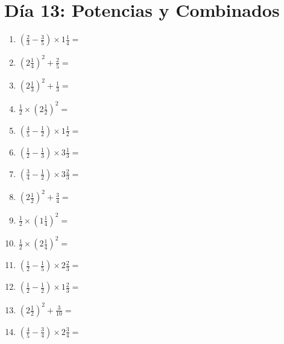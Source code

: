 \documentclass[12pt]{article}
\begin{document}
\section*{Día 13: Potencias y Combinados}
\begin{enumerate}
\item \large $ \left( \frac{2}{3} - \frac{3}{5} \right) \times 1 \frac{1}{4} = $ \vspace{1.6cm}
\item \large $ \left( 2 \frac{1}{4} \right)^2 + \frac{2}{5} = $ \vspace{1.6cm}
\item \large $ \left( 2 \frac{1}{3} \right)^2 + \frac{1}{3} = $ \vspace{1.6cm}
\item \large $ \frac{1}{2} \times \left( 2 \frac{1}{2} \right)^2 = $ \vspace{1.6cm}
\item \large $ \left( \frac{4}{5} - \frac{1}{2} \right) \times 1 \frac{1}{2} = $ \vspace{1.6cm}
\item \large $ \left( \frac{1}{2} - \frac{1}{3} \right) \times 3 \frac{1}{3} = $ \vspace{1.6cm}
\item \large $ \left( \frac{3}{4} - \frac{1}{2} \right) \times 3 \frac{2}{3} = $ \vspace{1.6cm}
\item \large $ \left( 2 \frac{1}{2} \right)^2 + \frac{3}{4} = $ \vspace{1.6cm}
\item \large $ \frac{1}{2} \times \left( 1 \frac{1}{4} \right)^2 = $ \vspace{1.6cm}
\item \large $ \frac{1}{2} \times \left( 2 \frac{1}{4} \right)^2 = $ \vspace{1.6cm}
\newpage
\item \large $ \left( \frac{1}{2} - \frac{1}{5} \right) \times 2 \frac{2}{3} = $ \vspace{1.6cm}
\item \large $ \left( \frac{1}{2} - \frac{1}{2} \right) \times 1 \frac{2}{3} = $ \vspace{1.6cm}
\item \large $ \left( 2 \frac{1}{2} \right)^2 + \frac{3}{10} = $ \vspace{1.6cm}
\item \large $ \left( \frac{4}{5} - \frac{3}{4} \right) \times 2 \frac{3}{4} = $ \vspace{1.6cm}

\end{enumerate}
\end{document}
